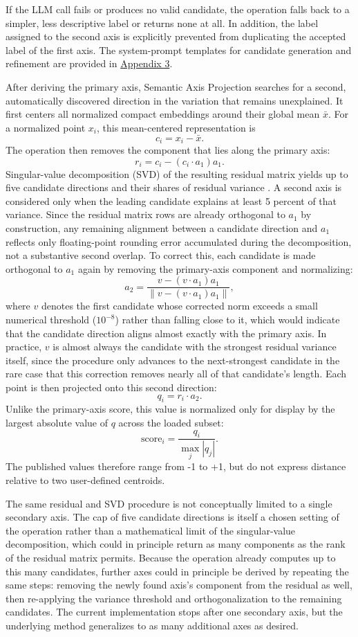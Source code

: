If the LLM call fails or produces no valid candidate, the operation falls back to a simpler, less descriptive label or returns none at all. In addition, the label assigned to the second axis is explicitly prevented from duplicating the accepted label of the first axis. The system-prompt templates for candidate generation and refinement are provided in \hyperref[app:3-axis-projection]{Appendix 3}.

After deriving the primary axis, Semantic Axis Projection searches for a second, automatically discovered direction in the variation that remains unexplained. It first centers all normalized compact embeddings around their global mean $\bar{x}$. For a normalized point $x_i$, this mean-centered representation is
\[
c_i = x_i - \bar{x}.
\]
The operation then removes the component that lies along the primary axis:
\[
r_i = c_i - (c_i \cdot a_1)a_1.
\]
Singular-value decomposition (SVD) of the resulting residual matrix yields up to five candidate directions and their shares of residual variance \cite{yu2024textembedding}. A second axis is considered only when the leading candidate explains at least 5 percent of that variance. Since the residual matrix rows are already orthogonal to $a_1$ by construction, any remaining alignment between a candidate direction and $a_1$ reflects only floating-point rounding error accumulated during the decomposition, not a substantive second overlap. To correct this, each candidate is made orthogonal to $a_1$ again by removing the primary-axis component and normalizing:
\[
a_2 =
\frac{v - (v \cdot a_1)a_1}
{\lVert v - (v \cdot a_1)a_1 \rVert},
\]
where $v$ denotes the first candidate whose corrected norm exceeds a small numerical threshold ($10^{-8}$) rather than falling close to it, which would indicate that the candidate direction aligns almost exactly with the primary axis. In practice, $v$ is almost always the candidate with the strongest residual variance itself, since the procedure only advances to the next-strongest candidate in the rare case that this correction removes nearly all of that candidate's length. Each point is then projected onto this second direction:
\[
q_i = r_i \cdot a_2.
\]
Unlike the primary-axis score, this value is normalized only for display by the largest absolute value of $q$ across the loaded subset:
\[
\mathrm{score}_i =
\frac{q_i}{\max_j |q_j|}.
\]
The published values therefore range from -1 to +1, but do not express distance relative to two user-defined centroids.

The same residual and SVD procedure is not conceptually limited to a single secondary axis. The cap of five candidate directions is itself a chosen setting of the operation rather than a mathematical limit of the singular-value decomposition, which could in principle return as many components as the rank of the residual matrix permits. Because the operation already computes up to this many candidates, further axes could in principle be derived by repeating the same steps: removing the newly found axis's component from the residual as well, then re-applying the variance threshold and orthogonalization to the remaining candidates. The current implementation stops after one secondary axis, but the underlying method generalizes to as many additional axes as desired.

